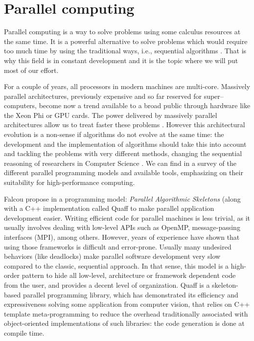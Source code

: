 
\section{Parallel computing}
\label{sec:parallel}

Parallel computing is a way to solve problems using some calculus resources at the same time. It is a powerful alternative to solve problems which would require too much time by using the traditional ways, i.e., sequential algorithms \cite{Grama2003}. That is why this field is in constant development and it is the topic where we will put most of our effort. 

For a couple of years, all processors in modern machines are multi-core. Massively parallel architectures, previously expensive and so far reserved for super--computers, become now a trend available to a broad public through hardware like the Xeon Phi or GPU cards. The power delivered by massively parallel architectures allow us to treat faster these problems \cite{Borkar2007}. However this architectural evolution is a non-sense if algorithms do not evolve at the same time: the development and the implementation of algorithms should take this into account and tackling the problems with very different methods, changing the sequential reasoning of researchers in Computer Science \cite{Hill2008, Sanders2014}. We can find in \cite{Diaz2012} a survey of the different parallel programming models and available tools, emphasizing on their suitability for high-performance computing.

Falcou propose in \cite{Falcou2009} a programming model: \textit{Parallel Algorithmic Skeletons} (along with a C++ implementation called {\sc Quaff} to make parallel application development easier. Writing efficient code for parallel machines is less trivial, as it usually involves dealing with low-level APIs such as OpenMP, message-passing interfaces (MPI), among others. However, years of experience have shown that using those frameworks is difficult and error-prone. Usually many undesired behaviors (like deadlocks) make parallel software development very slow compared to the classic, sequential approach. In that sense, this model is a high-order pattern to hide all low-level, architecture or framework dependent code from the user, and provides a decent level of organization. {\sc Quaff} is a skeleton-based parallel programming library, which has demonstrated its efficiency and expressiveness solving some application from computer vision, that relies on C++ template meta-programming to reduce the overhead traditionally associated with object-oriented implementations of such libraries: the code generation is done at compile time.

